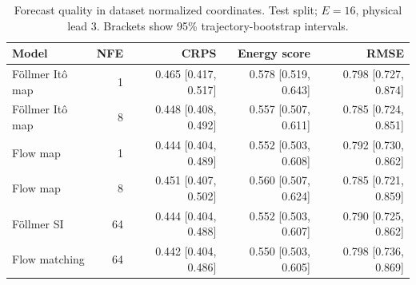 \begin{table}[t]
\centering
\small
\setlength{\tabcolsep}{3pt}
\caption{Forecast quality in dataset normalized coordinates. Test split; $E=16$, physical lead 3. Brackets show 95\% trajectory-bootstrap intervals.}
\label{tab:map-quality}
\begin{tabular}{lrrrr}
\toprule
Model & NFE & CRPS & Energy score & RMSE \\
\midrule
Föllmer Itô map & 1 & 0.465 [0.417, 0.517] & 0.578 [0.519, 0.643] & 0.798 [0.727, 0.874] \\
Föllmer Itô map & 8 & 0.448 [0.408, 0.492] & 0.557 [0.507, 0.611] & 0.785 [0.724, 0.851] \\
\addlinespace
Flow map & 1 & 0.444 [0.404, 0.489] & 0.552 [0.503, 0.608] & 0.792 [0.730, 0.862] \\
Flow map & 8 & 0.451 [0.407, 0.502] & 0.560 [0.507, 0.624] & 0.785 [0.721, 0.859] \\
\addlinespace
Föllmer SI & 64 & 0.444 [0.404, 0.488] & 0.552 [0.503, 0.607] & 0.790 [0.725, 0.862] \\
\addlinespace
Flow matching & 64 & 0.442 [0.404, 0.486] & 0.550 [0.503, 0.605] & 0.798 [0.736, 0.869] \\
\bottomrule
\end{tabular}
\end{table}
